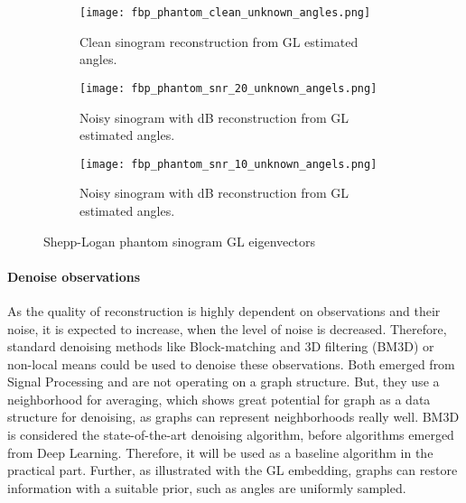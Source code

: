 \begin{figure}[H]
    \captionsetup[subfigure]{justification=centering}
    \centering
    \begin{subfigure}[t]{0.3\textwidth}
        \texttt{[image: fbp\_phantom\_clean\_unknown\_angles.png]}
        \caption{Clean sinogram reconstruction from GL estimated angles.}
        \label{fig:clean_reco_unknown}
    \end{subfigure}\hfill
    \begin{subfigure}[t]{0.3\textwidth}
      \texttt{[image: fbp\_phantom\_snr\_20\_unknown\_angels.png]}
      \caption{Noisy sinogram with  dB reconstruction from GL estimated angles.}
      \label{fig:noisy_snr20_reco_unknown}
    \end{subfigure}\hfill
    \begin{subfigure}[t]{0.3\textwidth}
      \texttt{[image: fbp\_phantom\_snr\_10\_unknown\_angels.png]}
      \caption{Noisy sinogram with  dB reconstruction from GL estimated angles.}
      \label{fig:noisy_snr10_reco_unknown}
    \end{subfigure}
    \caption{Shepp-Logan phantom sinogram GL eigenvectors}
    \label{fig:phantom_fbp_unknown_angles}
  \end{figure}


  \paragraph{Denoise observations}
  As the quality of reconstruction is highly dependent on observations and their noise, it
  is expected to increase, when the level of noise is decreased.
  Therefore, standard denoising methods like Block-matching and 3D filtering (BM3D) \cite{bm3d} or 
  non-local means \cite{noneLocalMean} could be used to denoise these observations.
  Both emerged from Signal Processing and are not operating on a graph structure. 
  But, they use a neighborhood for averaging, which shows great potential for graph 
  as a data structure for denoising, as graphs can represent neighborhoods really well.
  BM3D is considered the state-of-the-art denoising algorithm, before algorithms emerged from Deep Learning.
  Therefore, it will be used as a baseline algorithm in the practical part.
  Further, as illustrated with the GL embedding, graphs can restore information with a suitable prior,
  such as angles are uniformly sampled.

